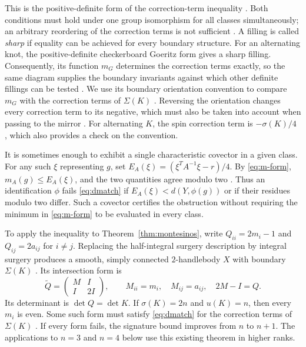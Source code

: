 \documentclass[12pt, oneside]{amsart}
\newcommand{\dbc}{\Sigma}
\begin{document}
This is the positive-definite form of the correction-term inequality
\cite{OS03,Owens}. Both conditions must hold under one group isomorphism for all
classes simultaneously; an arbitrary reordering of the correction terms is not
sufficient \cite[Thm.~4.1]{Owens}. A filling is called \emph{sharp} if equality can be
achieved for every boundary structure. For an alternating knot, the positive-definite
checkerboard Goeritz form gives a sharp filling. Consequently, its function $m_G$
determines the correction terms exactly, so the same diagram supplies the boundary
invariants against which other definite fillings can be tested \cite[Prop.~3.2]{OS05}.
We use its boundary orientation convention to compare $m_G$ with the correction terms
of $\dbc(K)$ \cite{OS05,Owens}. Reversing the orientation changes every correction term
to its negative, which must also be taken into account when passing to the mirror
\cite[Prop.~4.2]{OS03}. For alternating $K$, the spin correction term is
$-\sigma(K)/4$ \cite{MO}, which also provides a check on the convention.

It is sometimes enough to exhibit a single characteristic covector in a
given class. For any such $\xi$ representing $g$, set
$E_A(\xi)=(\xi^TA^{-1}\xi-r)/4$. By \eqref{eq:m-form},
$m_A(g)\le E_A(\xi)$, and the two quantities agree modulo two
\cite[\S4]{Owens}. Thus an identification $\phi$ fails
\eqref{eq:dmatch} if $E_A(\xi)<d(Y,\phi(g))$ or if their residues modulo two
differ. Such a covector certifies the obstruction without requiring the
minimum in \eqref{eq:m-form} to be evaluated in every class.

To apply the inequality to Theorem~\ref{thm:montesinos}, write
$Q_{ii}=2m_i-1$ and $Q_{ij}=2a_{ij}$ for $i\ne j$. Replacing the half-integral surgery description by
integral surgery produces a smooth, simply connected $2$-handlebody $X$ with
boundary $\dbc(K)$ \cite[Lem.~2.2 and proof of Thm.~5]{Owens}. Its intersection
form is
\begin{equation}\label{eq:qtilde-n}
    \widetilde Q=\begin{pmatrix}M&I\\ I&2I\end{pmatrix},
    \qquad M_{ii}=m_i,\quad M_{ij}=a_{ij},\quad 2M-I=Q.
\end{equation}
Its determinant is $\det Q=\det K$. If $\sigma(K)=2n$ and $u(K)=n$, then every $m_i$
is even. Some such form must satisfy \eqref{eq:dmatch} for the correction terms of
$\dbc(K)$ \cite[Thm.~5]{Owens}. If every form fails, the signature bound improves from
$n$ to $n+1$. The applications to $n=3$ and $n=4$ below use this existing theorem in
higher ranks.
\end{document}
